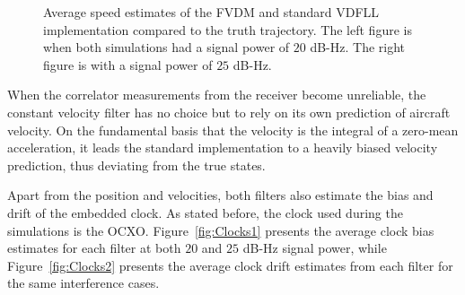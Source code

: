 \begin{figure}[!ht]
\begin{subfigure}{.45\textwidth}
    \end{subfigure}
    \caption{Average speed estimates of the FVDM and standard VDFLL implementation compared to the truth trajectory. The left figure is when both simulations had a signal power of \(20\) dB-Hz. The right figure is with a signal power of \(25\) dB-Hz.}\label{fig:Speed1}
\end{figure}

When the correlator measurements from the receiver become unreliable, the constant velocity filter has no choice but to rely on its own prediction of aircraft velocity. On the fundamental basis that the velocity is the integral of a zero-mean acceleration, it leads the standard implementation to a heavily biased velocity prediction, thus deviating from the true states.

Apart from the position and velocities, both filters also estimate the bias and drift of the embedded clock. As stated before, the clock used during the simulations is the OCXO\@. Figure~\ref{fig:Clocks1} presents the average clock bias estimates for each filter at both \(20\) and \(25\) dB-Hz signal power, while Figure~\ref{fig:Clocks2} presents the average clock drift estimates from each filter for the same interference cases.

